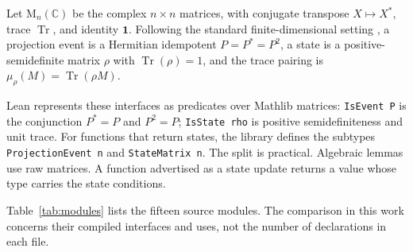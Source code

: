 \documentclass[11pt]{article}
\renewcommand{\_}{\textunderscore\allowbreak}
\theoremstyle{remark}
\newcommand{\C}{\mathbb C}
\newcommand{\Mn}{\mathrm{M}_n(\C)}
\newcommand{\Tr}{\operatorname{Tr}}
\newcommand{\one}{\mathbf 1}
\begin{document}
Let $\Mn$ be the complex $n\times n$ matrices, with conjugate transpose
$X\mapsto X^*$, trace $\Tr$, and identity $\one$. Following the standard
finite-dimensional setting \cite{vonneumann1932}, a projection event is a
Hermitian idempotent $P=P^*=P^2$, a state is a positive-semidefinite matrix
$\rho$ with $\Tr(\rho)=1$, and the trace pairing is
$\mu_\rho(M)=\Tr(\rho M)$.

Lean represents these interfaces as predicates over Mathlib matrices:
\texttt{IsEvent P} is the conjunction $P^*=P$ and $P^2=P$;
\texttt{IsState rho} is positive semidefiniteness and unit trace. For
functions that return states, the library defines the subtypes
\texttt{ProjectionEvent n} and \texttt{StateMatrix n}. The split is
practical. Algebraic lemmas use raw matrices. A function advertised as a state
update returns a value whose type carries the state conditions.

Table~\ref{tab:modules} lists the fifteen source modules. The comparison in
this work concerns their compiled interfaces and uses, not the number of
declarations in each file.
\end{document}
